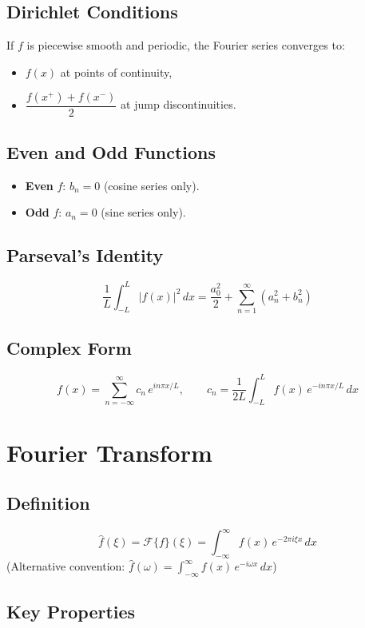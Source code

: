 \documentclass[12pt, a4paper]{article}
\theoremstyle{definition}
\theoremstyle{remark}
\begin{document}
\subsection{Dirichlet Conditions}
If $f$ is piecewise smooth and periodic, the Fourier series converges to:
\begin{itemize}
  \item $f(x)$ at points of continuity,
  \item $\dfrac{f(x^+)+f(x^-)}{2}$ at jump discontinuities.
\end{itemize}

\subsection{Even and Odd Functions}
\begin{itemize}
  \item \textbf{Even} $f$: $b_n = 0$ (cosine series only).
  \item \textbf{Odd} $f$: $a_n = 0$ (sine series only).
\end{itemize}

\subsection{Parseval's Identity}
\[
  \frac{1}{L}\int_{-L}^{L}|f(x)|^2\,dx
  = \frac{a_0^2}{2} + \sum_{n=1}^\infty \left(a_n^2 + b_n^2\right)
\]

\subsection{Complex Form}
\[
  f(x) = \sum_{n=-\infty}^\infty c_n\, e^{in\pi x/L},
  \qquad
  c_n = \frac{1}{2L}\int_{-L}^{L} f(x)\,e^{-in\pi x/L}\,dx
\]

\section{Fourier Transform}

\subsection{Definition}
\[
  \hat{f}(\xi) = \mathcal{F}\{f\}(\xi)
  = \int_{-\infty}^\infty f(x)\,e^{-2\pi i\xi x}\,dx
\]
(Alternative convention: $\hat{f}(\omega) = \int_{-\infty}^\infty f(x)\,e^{-i\omega x}\,dx$)

\subsection{Key Properties}
\end{document}
